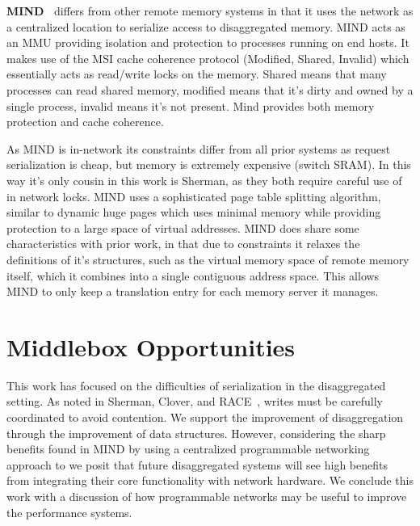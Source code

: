 \textbf{MIND~\cite{mind}} differs from other remote memory systems in that it
uses the network as a centralized location to serialize access to disaggregated
memory. MIND acts as an MMU providing isolation and protection to processes
running on end hosts. It makes use of the MSI cache coherence protocol (Modified,
Shared, Invalid) which essentially acts as read/write locks on the memory.
Shared means that many processes can read shared memory, modified means that
it's dirty and owned by a single process, invalid means it's not present.  Mind
provides both memory protection and cache coherence. 

As MIND is in-network its constraints differ from all prior systems as request
serialization is cheap, but memory is extremely expensive (switch SRAM). In this
way it's only cousin in this work is Sherman, as they both require careful use
of in network locks. MIND uses a sophisticated page table splitting algorithm,
similar to dynamic huge pages which uses minimal memory while providing
protection to a large space of virtual addresses. MIND does share some
characteristics with prior work, in that due to constraints it relaxes the
definitions of it's structures, such as the virtual memory space of remote
memory itself, which it combines into a single contiguous address space. This
allows MIND to only keep a translation entry for each memory server it manages.


\section{Middlebox Opportunities}

This work has focused on the difficulties of serialization in the disaggregated
setting. As noted in Sherman, Clover, and
RACE~\cite{sherman,clover,one-sided-hash}, writes must be carefully coordinated
to avoid contention. We support the improvement of disaggregation through the
improvement of data structures. However, considering the sharp benefits found in
MIND by using a centralized programmable networking approach to we posit that
future disaggregated systems will see high benefits from integrating their core
functionality with network hardware. We conclude this work with a discussion of
how programmable networks may be useful to improve the performance systems.

